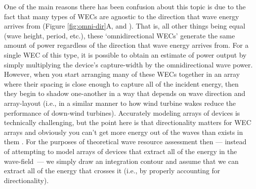 One of the main reasons there has been confusion about this topic is due to the fact that many types of WECs are agnostic to the direction that wave energy arrives from (Figure \ref{fig:omni-dir}A, and \cite{EPRIwaveresource2011} ). That is, all other things being equal (wave height, period, etc.), these `omnidirectional WECs' generate the same amount of power regardless of the direction that wave energy arrives from. For a single WEC of this type, it is possible to obtain an estimate of power output by simply multiplying the device's capture-width by the omnidirectional wave power. However, when you start arranging many of these WECs together in an array where their spacing is close enough to capture all of the incident energy, then they begin to shadow one-another in a way that depends on wave direction and array-layout (i.e., in a similar manner to how wind turbine wakes reduce the performance of down-wind turbines). Accurately modeling arrays of devices is technically challenging, but the point here is that directionality matters for WEC arrays and obviously you can't get more energy out of the waves than exists in them . For the purposes of theoretical wave resource assessment then — instead of attempting to model arrays of devices that extract all of the energy in the wave-field — we simply draw an integration contour and assume that we can extract all of the energy that crosses it (i.e., by properly accounting for directionality). 

